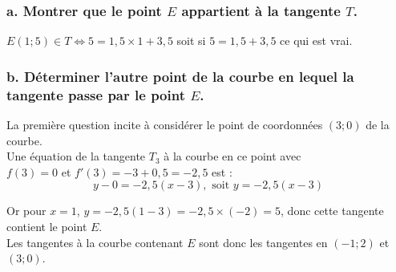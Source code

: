 \documentclass[10pt]{article}
\begin{document}
	\subsubsection*{a. Montrer que le point $E$ appartient à la tangente $T$.}
	
$E(1; 5) \in T \Leftrightarrow 5 = 1,5 \times 1 + 3,5$ soit si $5 = 1,5 + 3,5$ ce qui est vrai.
	
	\subsubsection*{b. Déterminer l'autre point de la courbe en lequel la tangente passe par le point $E$.}
	
La première question incite à considérer le point de coordonnées $(3; 0)$ de la courbe.\\
Une équation de la tangente $T_3$ à la courbe en ce point avec \\
$f(3) = 0$ et $f'(3) = -3 + 0,5 = -2,5$ est :
\[	y - 0 = -2,5(x - 3), \text{ soit } y = -2,5(x - 3)
	\]
	
Or pour $x = 1$, $y = -2,5(1 - 3) = -2,5 \times (-2) = 5$, donc cette tangente contient le point $E$.\\
 Les tangentes à la courbe contenant $E$ sont donc les tangentes en $(-1; 2)$ et $(3; 0)$.
\end{document}
